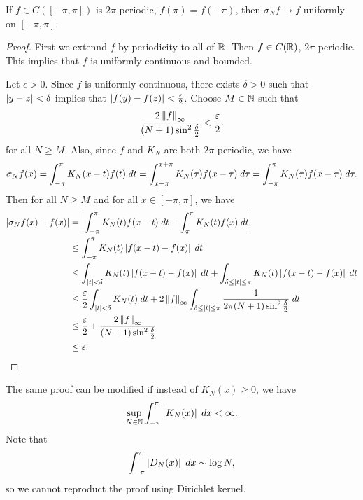 \documentclass[a4paper]{article}
\begin{document}
\begin{thm}[Fejer]
  If $f \in C([-\pi, \pi])$ is $2\pi$-periodic,
  $f(\pi) = f(-\pi)$, then 
  $\sigma_N f \to f$ uniformly on $[-\pi, \pi]$.
\end{thm}

\begin{proof}
First we extennd $f$ by periodicity to all of $\mathbb{R}$.
Then $f \in C(\mathbb{R})$, $2\pi$-periodic. This implies that 
$f$ is uniformly continuous and bounded. 

Let $\epsilon > 0$. Since $f$ is uniformly continuous, 
there exists $\delta > 0$ such that $\left\lvert y - z\right\rvert < \delta$ 
implies that $\left\lvert f(y) - f(z)\right\rvert < \frac{\varepsilon}{2}$. 
Choose $M \in \mathbb{N}$ such that
\[
\frac{2 \left\lVert f\right\rVert_\infty}{(N+1) \sin^2 \frac{\delta}{2}} 
< \frac{\varepsilon}{2}.
\]
for all $N \geq M$. 
Also, since $f$ and $K_N$ are both $2\pi$-periodic,
we have 
\[
\begin{aligned}
  \sigma_N f(x) 
  = \int_{-\pi}^\pi K_N(x - t) f(t) \; d t 
  = \int_{x - \pi}^{x + \pi} K_N(\tau) f(x - \tau) \; d \tau 
  = \int_{-\pi}^{\pi} K_N(\tau) f(x - \tau) \; d \tau.
\end{aligned}
\]
Then for all $N \geq M$ and for all $x \in [-\pi, \pi]$,
we have 
\[
\begin{aligned}
\left\lvert \sigma_N f(x) - f(x)\right\rvert 
&= \left\lvert \int_{-\pi}^\pi K_N(t) f(x-t) \; d t - 
\int_\pi^\pi K_N(t) f(x) \; d t\right\rvert \\
&\leq \int_{-\pi}^\pi K_N(t) \left\lvert f(x - t) - f(x)\right\rvert \; d t \\
&\leq \int_{\left\lvert t\right\rvert < \delta} K_N(t) \left\lvert f(x - t) - f(x)\right\rvert \; d t
+ \int_{\delta \leq \left\lvert t\right\rvert \leq \pi} K_N(t) \left\lvert f(x - t) - f(x)\right\rvert \; d t \\ 
&\leq \frac{\varepsilon}{2} \int_{\left\lvert t\right\rvert < \delta} 
K_N(t) \; d t + 2 \left\lVert f\right\rVert_\infty \int_{\delta \leq \left\lvert t\right\rvert \leq \pi}
\frac{1}{2\pi (N+1) \sin^2 \frac{\delta}{2}} \; d t \\
&\leq \frac{\varepsilon}{2} + \frac{2 \left\lVert f\right\rVert_\infty}{(N+1) 
\sin^2 \frac{\delta}{2}} \\
&\leq \varepsilon.
\end{aligned}
\]
\end{proof}

\begin{remark}
The same proof can be modified if instead of $K_N(x) \geq 0$,
we have
\[
\sup_{N \in \mathbb{N}} \int_{-\pi}^\pi \left\lvert K_N(x)\right\rvert \; d x < \infty.
\]
Note that 
\[
\int_{-\pi}^\pi \left\lvert D_N(x)\right\rvert \; d x \sim \log N,
\]
so we cannot reproduct the proof using Dirichlet kernel.
\end{remark}
\end{document}
